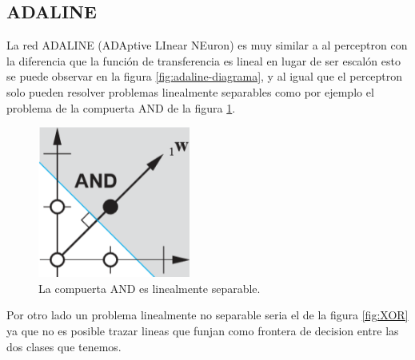        \subsection{ADALINE}
        La red ADALINE (ADAptive LInear NEuron) es muy similar a al perceptron con la diferencia que la función de transferencia es lineal en lugar de ser escalón esto se puede observar en la figura \ref{fig:adaline-diagrama}, y al igual que el perceptron solo pueden resolver problemas linealmente separables como por ejemplo el problema de la compuerta AND de la figura \ref{fig:AND}. \cite{pagina}
        \begin{figure}[H]
            \begin{center}
                \includegraphics[width=5cm]{img/adaline/AND.png}
                \caption{La compuerta AND es linealmente separable. \cite{libro1}}
                \label{fig:AND}
            \end{center}
        \end{figure}
        Por otro lado un problema linealmente no separable seria el de la figura \ref{fig:XOR} ya que no es posible trazar lineas que funjan como frontera de decision entre las dos clases que tenemos.
        
